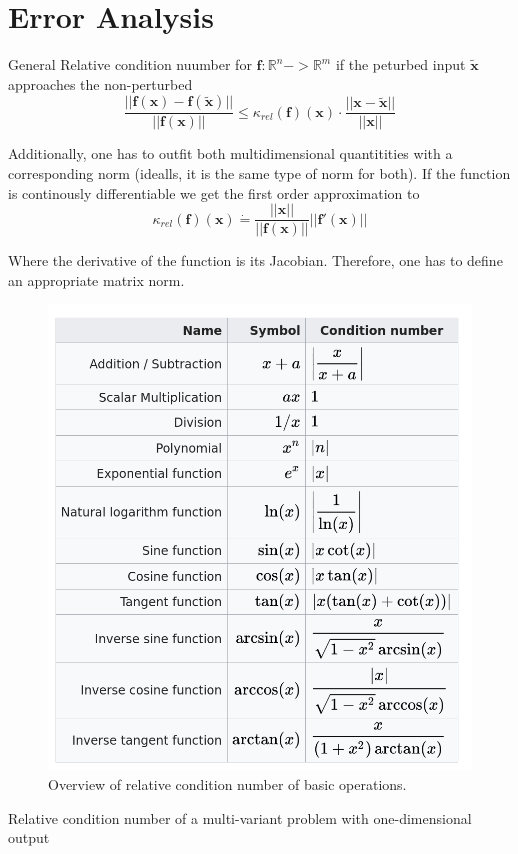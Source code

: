 \documentclass[
    a4paper,
    11pt
]{article}
\begin{document}

\section{Error Analysis}

General Relative condition nuumber for $\mathbf{f}:\mathbb{R}^n -> \mathbb{R}^m$ if the
peturbed input $\mathbf{\tilde{x}}$ approaches the non-perturbed
\begin{equation}
    \frac{||\mathbf{f}(\mathbf{x}) -
    \mathbf{f}(\mathbf{\tilde{x}})||}{||\mathbf{f}(\mathbf{x})||} \le
    \kappa_{rel}(\mathbf{f})(\mathbf{x}) \cdot
    \frac{||\mathbf{x} - \mathbf{\tilde{x}}||}{||\mathbf{x}||}
\end{equation}

Additionally, one has to outfit both multidimensional quantitities with a
corresponding norm (idealls, it is the same type of norm for both). If the
function is continously differentiable we get the first order approximation to
\begin{equation}
    \kappa_{rel}(\mathbf{f})(\mathbf{x}) \dot{=}
    \frac{||\mathbf{x}||}{||\mathbf{f}(\mathbf{x})||}
    ||\mathbf{f}'(\mathbf{x})||
\end{equation}

Where the derivative of the function is its Jacobian. Therefore, one has to
define an appropriate matrix norm.

\begin{figure}[H]
    \centering
    \includegraphics[width=0.5\linewidth]{basicOperations.png}
    \caption{Overview of relative condition number of basic operations.}
\end{figure}

Relative condition number of a multi-variant problem with one-dimensional output
\end{document}
